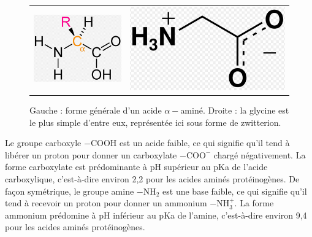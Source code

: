 \documentclass[11pt,a4paper]{report}
\begin{document}
\begin{figure}[h!]
	\begin{center}
		\begin{tabular}{cc}
  		\includegraphics[scale = 0.5]{alpha_amine.png} &
   		\includegraphics[scale = 0.35]{glycine.png}\\
	\end{tabular}
	\caption{Gauche : forme générale d'un acide $\alpha-$aminé. Droite : la glycine est le plus 			simple d'entre eux, représentée ici sous forme de zwitterion.}
	\end{center}
\end{figure}

Le groupe carboxyle $-\text{COOH}$ est un acide faible, ce qui signifie qu'il tend à libérer un proton pour donner un carboxylate $-\text{COO}^-$ chargé négativement. La forme carboxylate est prédominante à pH supérieur au pKa de l'acide carboxylique, c'est-à-dire environ 2,2 pour les acides aminés protéinogènes. De façon symétrique, le groupe amine $-\text{NH}_2$ est une base faible, ce qui signifie qu'il tend à recevoir un proton pour donner un ammonium $-\text{NH}_3^+$. La forme ammonium prédomine à pH inférieur au pKa de l'amine, c'est-à-dire environ 9,4 pour les acides aminés protéinogènes.
\end{document}
